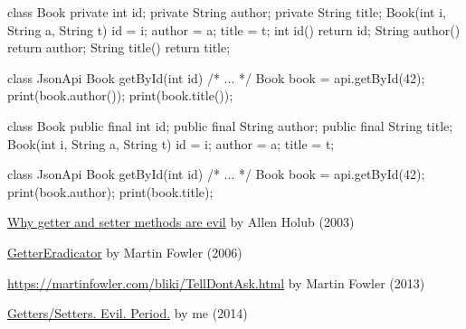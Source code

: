\documentclass{article}
\begin{document}
\begin{pptWide}{2}
{\small\begin{ffcode}
class Book {
  private int id;
  private String author;
  private String title;
  Book(int i, String a, String t)
    { id = i; author = a; title = t; }
  int id() { return id; }
  String author() { return author; }
  String title() { return title; }
}
\end{ffcode}
}
\par\columnbreak\par
{\small\begin{ffcode}
class JsonApi {
  Book getById(int id) { /* ... */ }
}
Book book = api.getById(42);
print(book.author());
print(book.title());
\end{ffcode}
}
\end{pptWide}
\par
\plush{}

\begin{pptWide}{2}
{\small\begin{ffcode}
class Book {
  public final int id;
  public final String author;
  public final String title;
  Book(int i, String a, String t)
    { id = i; author = a; title = t; }
}
\end{ffcode}
}
\par\columnbreak\par
{\small\begin{ffcode}
class JsonApi {
  Book getById(int id) { /* ... */ }
}
Book book = api.getById(42);
print(book.author);
print(book.title);
\end{ffcode}
}
\end{pptWide}
\par
\plush{}


\href{https://www.infoworld.com/article/2073723/why-getter-and-setter-methods-are-evil.html}{Why getter and setter methods are evil} by Allen Holub (2003)

\href{https://martinfowler.com/bliki/GetterEradicator.html}{GetterEradicator} by Martin Fowler (2006)

\href{TellDontAsk}{https://martinfowler.com/bliki/TellDontAsk.html} by Martin Fowler (2013)

\href{https://www.yegor256.com/2014/09/16/getters-and-setters-are-evil.html}{Getters/Setters. Evil. Period.} by me (2014)
\end{document}
